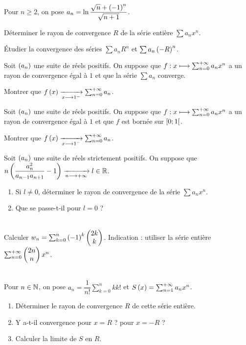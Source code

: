 \begin{exo}~\\
Pour \(n\geq2\), on pose \(a_n=\ln\dfrac{\sqrt{n}+\paren{-1}^n}{\sqrt{n+1}}\).

Déterminer le rayon de convergence \(R\) de la série entière \(\sum a_nx^n\).

Étudier la convergence des séries \(\sum a_nR^n\) et \(\sum a_n\paren{-R}^n\).
\end{exo}

\begin{exo}
Soit \(\paren{a_n}\) une suite de réels positifs. On suppose que \(f:x\mapsto\sum_{n=0}^{\pinf}a_nx^n\) a un rayon de convergence égal à \(1\) et que la série \(\sum a_n\) converge.

Montrer que \(f\paren{x}\tendqd{x\to1^-}\sum_{n=0}^{\pinf}a_n\).
\end{exo}

\begin{exo}
Soit \(\paren{a_n}\) une suite de réels positifs. On suppose que \(f:x\mapsto\sum_{n=0}^{\pinf}a_nx^n\) a un rayon de convergence égal à \(1\) et que \(f\) est bornée sur \(\intervie{0}{1}\).

Montrer que \(f\paren{x}\tendqd{x\to1^-}\sum_{n=0}^{\pinf}a_n\).
\end{exo}

\begin{exo}
Soit \(\paren{a_n}\) une suite de réels strictement positifs. On suppose que \(n\paren{\dfrac{a_n^2}{a_{n-1}a_{n+1}}-1}\tendqd{n\to\pinf}l\in\R\).

\begin{enumerate}
    \item Si \(l\not=0\), déterminer le rayon de convergence de la série \(\sum a_nx^n\). \\
    \item Que se passe-t-il pour \(l=0\) ?
\end{enumerate}
\end{exo}

\begin{exo}~\\
Calculer \(w_n=\sum_{k=0}^n\paren{-1}^k\binom{k}{2k}\). Indication : utiliser la série entière \(\sum_{n=0}^{\pinf}\binom{n}{2n}x^n\).
\end{exo}

\begin{exo}~\\
Pour \(n\in\N\), on pose \(a_n=\dfrac{1}{n!}\sum_{k=0}^nkk!\) et \(S\paren{x}=\sum_{n=1}^{\pinf}a_nx^n\).

\begin{enumerate}
    \item Déterminer le rayon de convergence \(R\) de cette série entière. \\
    \item Y a-t-il convergence pour \(x=R\) ? pour \(x=-R\) ? \\
    \item Calculer la limite de \(S\) en \(R\).
\end{enumerate}
\end{exo}

